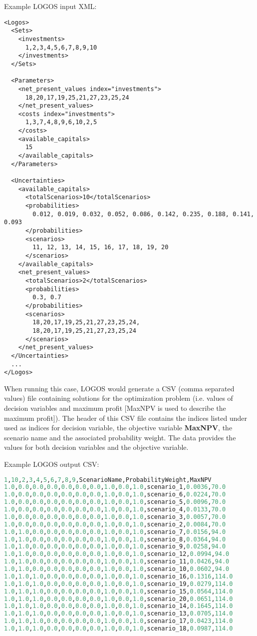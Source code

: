 Example LOGOS input XML:
\begin{lstlisting}[style=XML]
<Logos>
  <Sets>
    <investments>
      1,2,3,4,5,6,7,8,9,10
    </investments>
  </Sets>

  <Parameters>
    <net_present_values index="investments">
      18,20,17,19,25,21,27,23,25,24
    </net_present_values>
    <costs index="investments">
      1,3,7,4,8,9,6,10,2,5
    </costs>
    <available_capitals>
      15
    </available_capitals>
  </Parameters>

  <Uncertainties>
    <available_capitals>
      <totalScenarios>10</totalScenarios>
      <probabilities>
        0.012, 0.019, 0.032, 0.052, 0.086, 0.142, 0.235, 0.188, 0.141, 0.093
      </probabilities>
      <scenarios>
        11, 12, 13, 14, 15, 16, 17, 18, 19, 20
      </scenarios>
    </available_capitals>
    <net_present_values>
      <totalScenarios>2</totalScenarios>
      <probabilities>
        0.3, 0.7
      </probabilities>
      <scenarios>
        18,20,17,19,25,21,27,23,25,24,
        18,20,17,19,25,21,27,23,25,24
      </scenarios>
    </net_present_values>
  </Uncertainties>
  ...
</Logos>
\end{lstlisting}

When running this case, LOGOS would generate a CSV (comma separated values) file
containing solutions for the optimization problem (i.e. values of decision variables
and maximum profit [MaxNPV is used to describe the maximum profit]). The header of
this CSV file contains the indices listed under 
used as indices for decision variable, the objective variable \textbf{MaxNPV},
the scenario name and the associated probability weight.
The data provides the values for both decision variables and the objective variable.

Example LOGOS output CSV:
\begin{lstlisting}[basicstyle=\small,language=python]
1,10,2,3,4,5,6,7,8,9,ScenarioName,ProbabilityWeight,MaxNPV
1.0,0.0,0.0,0.0,0.0,0.0,0.0,1.0,0.0,1.0,scenario_1,0.0036,70.0
1.0,0.0,0.0,0.0,0.0,0.0,0.0,1.0,0.0,1.0,scenario_6,0.0224,70.0
1.0,0.0,0.0,0.0,0.0,0.0,0.0,1.0,0.0,1.0,scenario_5,0.0096,70.0
1.0,0.0,0.0,0.0,0.0,0.0,0.0,1.0,0.0,1.0,scenario_4,0.0133,70.0
1.0,0.0,0.0,0.0,0.0,0.0,0.0,1.0,0.0,1.0,scenario_3,0.0057,70.0
1.0,0.0,0.0,0.0,0.0,0.0,0.0,1.0,0.0,1.0,scenario_2,0.0084,70.0
1.0,1.0,0.0,0.0,0.0,0.0,0.0,1.0,0.0,1.0,scenario_7,0.0156,94.0
1.0,1.0,0.0,0.0,0.0,0.0,0.0,1.0,0.0,1.0,scenario_8,0.0364,94.0
1.0,1.0,0.0,0.0,0.0,0.0,0.0,1.0,0.0,1.0,scenario_9,0.0258,94.0
1.0,1.0,0.0,0.0,0.0,0.0,0.0,1.0,0.0,1.0,scenario_12,0.0994,94.0
1.0,1.0,0.0,0.0,0.0,0.0,0.0,1.0,0.0,1.0,scenario_11,0.0426,94.0
1.0,1.0,0.0,0.0,0.0,0.0,0.0,1.0,0.0,1.0,scenario_10,0.0602,94.0
1.0,1.0,1.0,0.0,0.0,0.0,0.0,1.0,0.0,1.0,scenario_16,0.1316,114.0
1.0,1.0,1.0,0.0,0.0,0.0,0.0,1.0,0.0,1.0,scenario_19,0.0279,114.0
1.0,1.0,1.0,0.0,0.0,0.0,0.0,1.0,0.0,1.0,scenario_15,0.0564,114.0
1.0,1.0,1.0,0.0,0.0,0.0,0.0,1.0,0.0,1.0,scenario_20,0.0651,114.0
1.0,1.0,1.0,0.0,0.0,0.0,0.0,1.0,0.0,1.0,scenario_14,0.1645,114.0
1.0,1.0,1.0,0.0,0.0,0.0,0.0,1.0,0.0,1.0,scenario_13,0.0705,114.0
1.0,1.0,1.0,0.0,0.0,0.0,0.0,1.0,0.0,1.0,scenario_17,0.0423,114.0
1.0,1.0,1.0,0.0,0.0,0.0,0.0,1.0,0.0,1.0,scenario_18,0.0987,114.0
\end{lstlisting}

